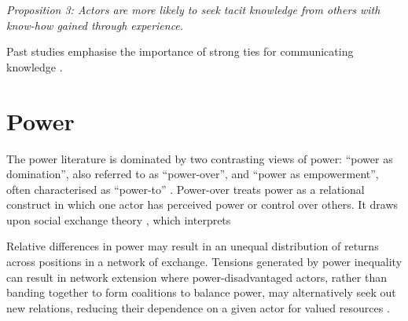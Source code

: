 

\emph{Proposition 3: Actors are more likely to seek tacit knowledge from others with know-how gained through experience.}





Past studies emphasise the importance of strong ties for communicating knowledge \citep[e.g.][]{hansen1999search,szulanski1996exploring,uzzi1997social}.







\section{Power}

The power literature is dominated by two contrasting views of power: \enquote{power as domination}, also referred to as \enquote{power-over}, and \enquote{power as empowerment}, often characterised as \enquote{power-to} \citep{haugaard2012rethinking}. Power-over treats power as a relational construct in which one actor has perceived power or control over others. It draws upon social exchange theory \citep{emerson1962power,homans1961social}, which interprets 

Relative differences in power may result in an unequal distribution of returns across positions in a network of exchange. Tensions generated by power inequality can result in network extension where power-disadvantaged actors, rather than banding together to form coalitions to balance power, may alternatively seek out new relations, reducing their dependence on a given actor for valued resources \citep{cook2013social}. 

